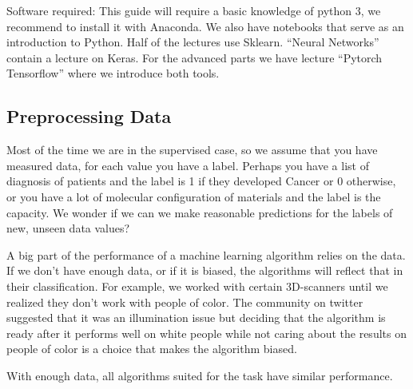 \documentclass[11pt,letterpaper]{report}
\begin{document}
	Software required:
	This guide will require a basic knowledge of python 3, we recommend to install it with Anaconda. We also have notebooks that serve as an introduction to Python.
	Half of the lectures use  Sklearn. ``Neural Networks'' contain a lecture on Keras. For the advanced parts we have lecture ``Pytorch Tensorflow'' where we introduce both tools.
	
	
	

	\subsection{Preprocessing Data}
	Most of the time we are in the supervised case, so we assume that you have measured data, for each value you have a label. Perhaps you have a list of diagnosis of patients and the label is 1 if they developed Cancer or 0 otherwise, or you have a lot of molecular configuration of materials and the label is the capacity. We wonder if we  can we make reasonable predictions for the labels of new, unseen data values?
	
	 A big part of the performance of a machine learning algorithm relies on the data. If we don't have enough data, or if it is biased, the algorithms will reflect that in their classification. For example, we worked with certain 3D-scanners until we realized they don't work with people of color. The community on twitter suggested that it was an illumination issue but deciding that the algorithm is ready after it performs well on white people while not caring about the results on people of color is a choice that makes the algorithm biased.
	 
	 With enough data, all algorithms suited for the task have similar performance. 
	 
\end{document}
